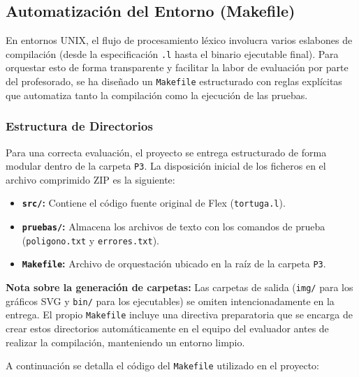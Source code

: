 \documentclass[12pt,a4paper]{article}
\begin{document}
\subsection{Automatización del Entorno (Makefile)}
En entornos UNIX, el flujo de procesamiento léxico involucra varios eslabones de compilación (desde la especificación \texttt{.l} hasta el binario ejecutable final). Para orquestar esto de forma transparente y facilitar la labor de evaluación por parte del profesorado, se ha diseñado un \texttt{Makefile} estructurado con reglas explícitas que automatiza tanto la compilación como la ejecución de las pruebas.

\subsubsection{Estructura de Directorios}
Para una correcta evaluación, el proyecto se entrega estructurado de forma modular dentro de la carpeta \texttt{P3}. La disposición inicial de los ficheros en el archivo comprimido ZIP es la siguiente:
\begin{itemize}
    \item \textbf{\texttt{src/}:} Contiene el código fuente original de Flex (\texttt{tortuga.l}).
    \item \textbf{\texttt{pruebas/}:} Almacena los archivos de texto con los comandos de prueba (\texttt{poligono.txt} y \texttt{errores.txt}).
    \item \textbf{\texttt{Makefile}:} Archivo de orquestación ubicado en la raíz de la carpeta \texttt{P3}.
\end{itemize}
\newpage
\textbf{Nota sobre la generación de carpetas:} Las carpetas de salida (\texttt{img/} para los gráficos SVG y \texttt{bin/} para los ejecutables) se omiten intencionadamente en la entrega. El propio \texttt{Makefile} incluye una directiva preparatoria que se encarga de crear estos directorios automáticamente en el equipo del evaluador antes de realizar la compilación, manteniendo un entorno limpio.

A continuación se detalla el código del \texttt{Makefile} utilizado en el proyecto:
\end{document}
